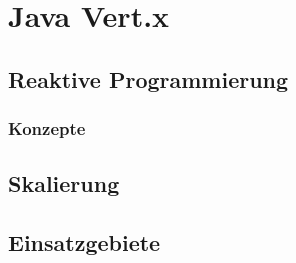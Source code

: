 \chapter{Java Vert.x}

\section{Reaktive Programmierung}

\subsection{Konzepte}

\section{Skalierung}

\section{Einsatzgebiete}

